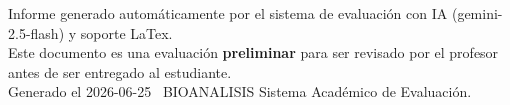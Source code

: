 \documentclass[11pt,a4paper]{article}
\begin{document}
\vspace{12pt}
\begin{center}
  \footnotesize\color{gray}
  Informe generado automáticamente por el sistema de evaluación con IA (gemini-2.5-flash) y soporte LaTex. \\
  Este documento es una evaluación \textbf{preliminar} para ser revisado por el profesor antes de ser entregado al 
  estudiante. \\
  Generado el 2026-06-25 \textbullet\ BIOANALISIS Sistema Académico de Evaluación.
  \end{center}
\end{document}
